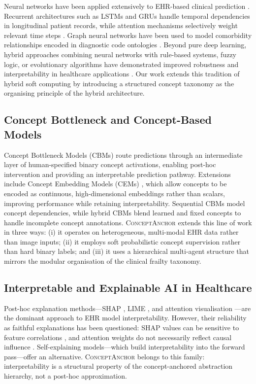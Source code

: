 \documentclass[review,12pt,authoryear]{elsarticle}
\newcommand{\modelname}{\textsc{ConceptAnchor}}
\begin{document}
Neural networks have been applied extensively to EHR-based clinical prediction \citep{choi2016retain, rasmy2021med}.
Recurrent architectures such as LSTMs and GRUs handle temporal dependencies in longitudinal patient records, while attention mechanisms selectively weight relevant time steps \citep{choi2016retain}.
Graph neural networks have been used to model comorbidity relationships encoded in diagnostic code ontologies \citep{shang2019pre}.
Beyond pure deep learning, hybrid approaches combining neural networks with rule-based systems, fuzzy logic, or evolutionary algorithms have demonstrated improved robustness and interpretability in healthcare applications \citep{abraham2005hybrid}.
Our work extends this tradition of hybrid soft computing by introducing a structured concept taxonomy as the organising principle of the hybrid architecture.

\subsection{Concept Bottleneck and Concept-Based Models}

Concept Bottleneck Models (CBMs) \citep{koh2020concept} route predictions through an intermediate layer of human-specified binary concept activations, enabling post-hoc intervention and providing an interpretable prediction pathway.
Extensions include Concept Embedding Models (CEMs) \citep{zarlenga2022concept}, which allow concepts to be encoded as continuous, high-dimensional embeddings rather than scalars, improving performance while retaining interpretability.
Sequential CBMs \citep{shin2023closer} model concept dependencies, while hybrid CBMs \citep{espinosa2022concept} blend learned and fixed concepts to handle incomplete concept annotations.
\modelname{} extends this line of work in three ways: (i) it operates on heterogeneous, multi-modal EHR data rather than image inputs; (ii) it employs soft probabilistic concept supervision rather than hard binary labels; and (iii) it uses a hierarchical multi-agent structure that mirrors the modular organisation of the clinical frailty taxonomy.

\subsection{Interpretable and Explainable AI in Healthcare}

Post-hoc explanation methods—SHAP \citep{lundberg2017unified}, LIME \citep{ribeiro2016should}, and attention visualisation \citep{choi2016retain}—are the dominant approach to EHR model interpretability.
However, their reliability as faithful explanations has been questioned: SHAP values can be sensitive to feature correlations \citep{kumar2020problems}, and attention weights do not necessarily reflect causal influence \citep{jain2019attention}.
Self-explaining models—which build interpretability into the forward pass—offer an alternative.
\modelname{} belongs to this family: interpretability is a structural property of the concept-anchored abstraction hierarchy, not a post-hoc approximation.
\end{document}
